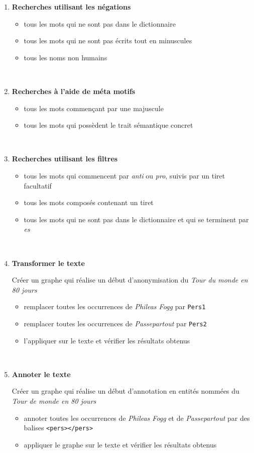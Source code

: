 \documentclass[xcolor={table,usenames,dvipsnames}]{article}
\begin{document}
\begin{enumerate}
\item \textbf{Recherches utilisant les négations}
\begin{itemize}
\item tous les mots qui ne sont pas dans le dictionnaire
\item tous les mots qui ne sont pas écrits tout en minuscules
\item tous les noms non humains
\end{itemize}
	\\
\bigskip

\item \textbf{Recherches à l'aide de méta motifs}
\begin{itemize}
	\item tous les mots commençant par une majuscule
	\item tous les mots qui possèdent le trait sémantique \og{}concret\fg{}
\end{itemize}
\\
\bigskip

\item \textbf{Recherches utilisant les filtres}
\begin{itemize}
	\item tous les mots qui commencent par \textit{anti} ou \textit{pro}, suivis par un tiret facultatif
	\item tous les mots composés contenant un tiret
	\item tous les mots qui ne sont pas dans le dictionnaire et qui se terminent par \textit{es}
\end{itemize}
\\
\bigskip
\item \textbf{Transformer le texte}

Créer un graphe qui réalise un début d'anonymisation du \textit{Tour du monde en 80 jours}
	\begin{itemize}
	\item remplacer toutes les occurrences de \textit{Phileas Fogg} par \texttt{Pers1}
	\item remplacer toutes les occurrences de \textit{Passepartout} par \texttt{Pers2}
	\item l'appliquer sur le texte et vérifier les résultats obtenus
\end{itemize}

\\
\bigskip


\item \textbf{Annoter le texte}

Créer un graphe qui réalise un début d'annotation en entités nommées du \textit{Tour de monde en 80 jours}
	\begin{itemize}
	\item annoter toutes les occurrences de \textit{Phileas Fogg} et de \textit{Passepartout} par des balises \texttt{<pers></pers>}
	\item appliquer le graphe sur le texte et vérifier les résultats obtenus
\end{itemize}
\end{enumerate}
\end{document}
